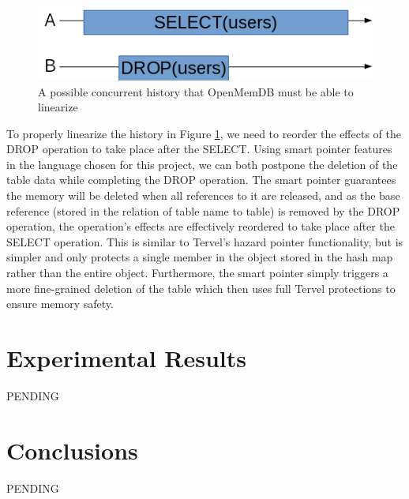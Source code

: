 \documentclass[conference, compsoc]{IEEEtran}
\begin{document}
\begin{figure}[h]
\centering
  \includegraphics[scale=.75]{concurrent_history_1}
  \caption{A possible concurrent history that OpenMemDB must be able to linearize}
  \label{concurrent_history}
\end{figure}

\par\vspace{\baselineskip}
To properly linearize the history in Figure \ref{concurrent_history}, we need to reorder 
the effects of the DROP operation to take place after the SELECT. Using smart pointer features 
in the language chosen for this project, we can both postpone the deletion of the 
table data while completing the DROP operation. The smart pointer guarantees the memory will 
be deleted when all references to it are released, and as the base reference (stored in the 
relation of table name to table) is removed by the DROP operation, the operation's effects 
are effectively reordered to take place after the SELECT operation. This is similar to Tervel's 
hazard pointer functionality, but is simpler and only protects a single member in the object stored
in the hash map rather than the entire object. Furthermore, the smart pointer simply triggers a 
more fine-grained deletion of the table which then uses full Tervel protections to ensure memory
safety.

\section{Experimental Results}
PENDING

\section{Conclusions}
PENDING

\newpage


\newpage
\end{document}
